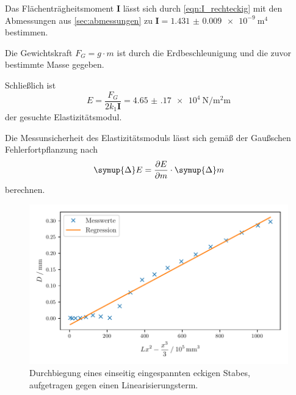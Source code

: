 Das Flächenträgheitsmoment $\mathbf{I}$ lässt sich durch \autoref{eqn:I_rechteckig} mit den Abmessungen aus \autoref{sec:abmessungen} zu
$\mathbf{I} = \SI[{scientific-notation = true, separate-uncertainty = true}]{1.431(9)e-9}{\meter\tothe{4}}$ bestimmen.

Die Gewichtskraft $F_G = g \cdot m$ ist durch die Erdbeschleunigung und die zuvor bestimmte Masse gegeben.

Schließlich ist
\begin{equation*}
  E
  = \frac{F_G}{2 k_1 \mathbf{I}}
  = \SI[{scientific-notation = true, separate-uncertainty = true}]{4.65(17)e4}{\newton\per\square\milli\meter}
\end{equation*}
der gesuchte Elastizitätsmodul.

Die Messunsicherheit des Elastizitätsmoduls lässt sich gemäß der Gaußschen Fehlerfortpflanzung nach
\begin{equation*}
  \symup{\Delta}E = \frac{\partial E}{\partial m} \cdot \symup{\Delta}m
\end{equation*}
berechnen.

\begin{figure}
  \centering
  \includegraphics[scale=0.8]{build/plot_einseitig_eckig.pdf}
  \caption{Durchbiegung eines einseitig eingespannten eckigen Stabes, aufgetragen gegen einen Linearisierungsterm.}
  \label{fig:regression1}
\end{figure}
